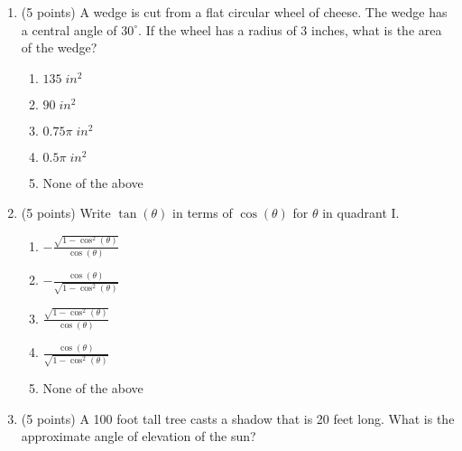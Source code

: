 \documentclass[fleqn]{article}
\begin{document}
\begin{enumerate}
\begin{enumerate}
\end{enumerate}

\vspace{0.5in}

\item
(5 points) A wedge is cut from a flat circular wheel of cheese.
The wedge has a central angle of $30^\circ$.
If the wheel has a radius of 3 inches, what is the area of the wedge?

\begin{enumerate}
\item $135 \; in^2$

\item $90 \; in^2$

\item $0.75\pi \; in^2$

\item $0.5\pi \; in^2$

\item None of the above

\end{enumerate}

\vspace{0.5in}

\item (5 points) Write $\tan(\theta)$ in terms of $\cos(\theta)$ for $\theta$ in quadrant I.

\begin{enumerate}
\item $\displaystyle -\frac{\sqrt{1 - \cos^2(\theta)}}{\cos(\theta)}$
\vspace{.05in}
\item $\displaystyle -\frac{\cos(\theta)}{\sqrt{1 - \cos^2(\theta)}}$
\vspace{.05in}
\item $\displaystyle \frac{\sqrt{1 - \cos^2(\theta)}}{\cos(\theta)}$
\vspace{.05in}
\item $\displaystyle \frac{\cos(\theta)}{\sqrt{1 - \cos^2(\theta)}}$
\vspace{.05in}
\item None of the above

\end{enumerate}

\vspace{0.5in}

\item
(5 points) A 100 foot tall tree casts a shadow that is 20 feet long.
What is the approximate angle of elevation of the sun?


\end{enumerate}
\end{document}

